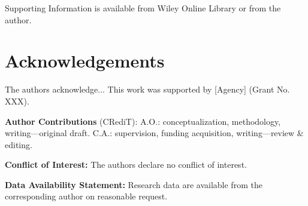 \documentclass[12pt]{article}
\begin{document}
Supporting Information is available from Wiley Online Library or from the author.

\section*{Acknowledgements}
The authors acknowledge...
This work was supported by [Agency] (Grant No. XXX).

\noindent\textbf{Author Contributions} (CRediT):
A.O.: conceptualization, methodology, writing—original draft.
C.A.: supervision, funding acquisition, writing—review \& editing.

\noindent\textbf{Conflict of Interest:} The authors declare no conflict of interest.

\noindent\textbf{Data Availability Statement:} Research data are available from the corresponding author on reasonable request.



\end{document}
